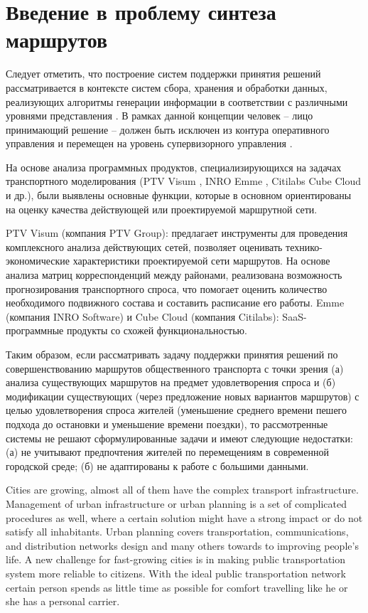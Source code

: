 \chapter{Введение в проблему синтеза маршрутов}
Следует отметить, что построение систем поддержки принятия решений рассматривается в контексте систем 
сбора, хранения и обработки данных, реализующих алгоритмы генерации информации в соответствии с различными 
уровнями представления \cite{bib:4}. В рамках данной концепции человек -- лицо принимающий решение -- 
должен быть исключен из контура оперативного управления и перемещен на уровень супервизорного управления 
\cite{bib:5}.

На основе анализа программных продуктов, специализирующихся на задачах транспортного моделирования 
(PTV Visum \cite{bib:6}, INRO Emme \cite{bib:7}, Citilabs Cube Cloud \cite{bib:8} и др.), были выявлены 
основные функции, которые в основном ориентированы на оценку качества действующей или проектируемой 
маршрутной сети.

PTV Visum (компания PTV Group): предлагает инструменты для проведения комплексного анализа действующих 
сетей, позволяет оценивать технико-экономические характеристики проектируемой сети маршрутов. На основе 
анализа матриц корреспонденций между районами, реализована возможность прогнозирования транспортного спроса, 
что помогает оценить количество необходимого подвижного состава и составить расписание его работы. 
Emme (компания INRO Software) и Cube Cloud (компания Citilabs): SaaS-программные продукты со схожей 
функциональностью.

Таким образом, если рассматривать задачу поддержки принятия решений по совершенствованию маршрутов 
общественного транспорта с точки зрения (а) анализа существующих маршрутов на предмет удовлетворения 
спроса и (б) модификации существующих (через предложение новых вариантов маршрутов) с целью удовлетворения 
спроса жителей (уменьшение среднего времени пешего подхода до остановки и уменьшение времени поездки), то 
рассмотренные системы не решают сформулированные задачи и имеют следующие недостатки: (а) не учитывают 
предпочтения жителей по перемещениям в современной городской среде; (б) не адаптированы к работе с 
большими данными.

Cities are growing, almost all of them have the complex transport infrastructure. Management of urban 
infrastructure or urban planning is a set of complicated procedures as well, where a certain solution 
might have a strong impact or do not satisfy all inhabitants. Urban planning covers transportation, 
communications, and distribution networks design and many others towards to improving people’s life. 
A new challenge for fast-growing cities is in making public transportation system more reliable to 
citizens. With the ideal public transportation network certain person spends as little time as possible 
for comfort travelling like he or she has a personal carrier. 

